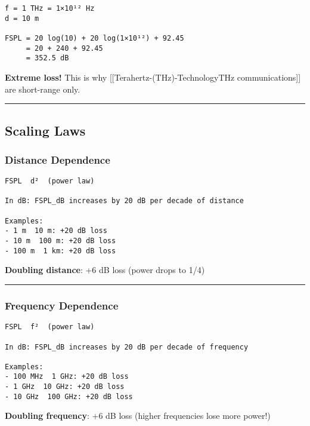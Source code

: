 \begin{verbatim}
f = 1 THz = 1×10¹² Hz
d = 10 m

FSPL = 20 log(10) + 20 log(1×10¹²) + 92.45
     = 20 + 240 + 92.45
     = 352.5 dB
\end{verbatim}

\textbf{Extreme loss!} This is why
{[}{[}Terahertz-(THz)-Technology\textbar THz communications{]}{]} are
short-range only.

\begin{center}\rule{0.5\linewidth}{0.5pt}\end{center}

\subsection{\texorpdfstring{ Scaling
Laws}{ Scaling Laws}}\label{scaling-laws}

\subsubsection{Distance Dependence}\label{distance-dependence}

\begin{verbatim}
FSPL  d²  (power law)

In dB: FSPL_dB increases by 20 dB per decade of distance

Examples:
- 1 m  10 m: +20 dB loss
- 10 m  100 m: +20 dB loss
- 100 m  1 km: +20 dB loss
\end{verbatim}

\textbf{Doubling distance}: +6 dB loss (power drops to 1/4)

\begin{center}\rule{0.5\linewidth}{0.5pt}\end{center}

\subsubsection{Frequency Dependence}\label{frequency-dependence}

\begin{verbatim}
FSPL  f²  (power law)

In dB: FSPL_dB increases by 20 dB per decade of frequency

Examples:
- 100 MHz  1 GHz: +20 dB loss
- 1 GHz  10 GHz: +20 dB loss
- 10 GHz  100 GHz: +20 dB loss
\end{verbatim}

\textbf{Doubling frequency}: +6 dB loss (higher frequencies lose more
power!)

